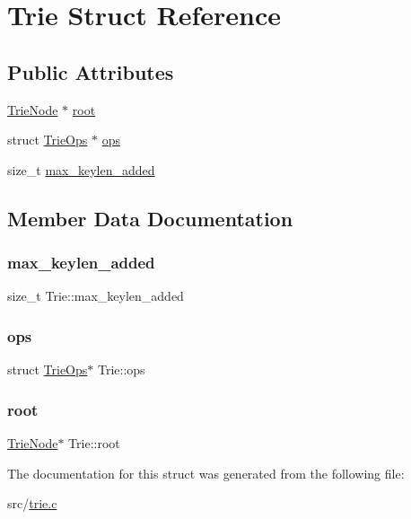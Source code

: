 \hypertarget{structTrie}{}\section{Trie Struct Reference}
\label{structTrie}
\subsection*{Public Attributes}
\begin{DoxyCompactItemize}
\item 
\mbox{\hyperlink{structTrieNode}{Trie\+Node}} $\ast$ \mbox{\hyperlink{structTrie_a052cecab75ca88758778d340ed002d66}{root}}
\item 
struct \mbox{\hyperlink{structTrieOps}{Trie\+Ops}} $\ast$ \mbox{\hyperlink{structTrie_a5da62ac2f1c44b779aa5d32242fb091e}{ops}}
\item 
size\+\_\+t \mbox{\hyperlink{structTrie_a1fe017d88dc057b0efb1bed507c418c7}{max\+\_\+keylen\+\_\+added}}
\end{DoxyCompactItemize}


\subsection{Member Data Documentation}
\mbox{\label{structTrie_a1fe017d88dc057b0efb1bed507c418c7}} 
\subsubsection{\texorpdfstring{max\_keylen\_added}{max\_keylen\_added}}
{\footnotesize\ttfamily size\+\_\+t Trie\+::max\+\_\+keylen\+\_\+added}

\mbox{\label{structTrie_a5da62ac2f1c44b779aa5d32242fb091e}} 
\subsubsection{\texorpdfstring{ops}{ops}}
{\footnotesize\ttfamily struct \mbox{\hyperlink{structTrieOps}{Trie\+Ops}}$\ast$ Trie\+::ops}

\mbox{\label{structTrie_a052cecab75ca88758778d340ed002d66}} 
\subsubsection{\texorpdfstring{root}{root}}
{\footnotesize\ttfamily \mbox{\hyperlink{structTrieNode}{Trie\+Node}}$\ast$ Trie\+::root}



The documentation for this struct was generated from the following file\+:\begin{DoxyCompactItemize}
\item 
src/\mbox{\hyperlink{trie_8c}{trie.\+c}}\end{DoxyCompactItemize}
